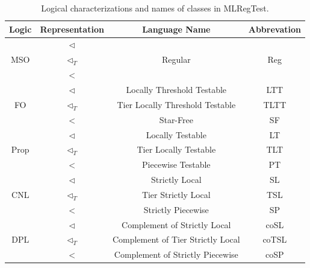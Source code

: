 \documentclass[twoside,11pt]{article}
\begin{document}
  \begin{table}[!t]
    \centering
    \begin{tabular}{cccc}
      \toprule
      Logic                 & Representation    & Language Name                     & Abbrevation          \\
      \midrule
      \multirow{3}{*}{MSO}  & $\triangleleft$   & \multirow{3}{*}{Regular}          & \multirow{3}{*}{Reg} \\
                            & $\triangleleft_T$ &           &                      \\
                            & $<$               &          &                      \\
      \midrule
      \multirow{3}{*}{FO}   & $\triangleleft$   & Locally Threshold Testable        & LTT                  \\
                            & $\triangleleft_T$ & Tier Locally Threshold Testable   & TLTT                 \\
                            & $<$               & Star-Free                         & SF                   \\
      \midrule
      \multirow{3}{*}{Prop} & $\triangleleft$   & Locally Testable                  & LT                   \\
                            & $\triangleleft_T$ & Tier Locally Testable             & TLT                  \\
                            & $<$               & Piecewise Testable                & PT                   \\
      \midrule
      \multirow{3}{*}{CNL}  & $\triangleleft$   & Strictly Local                    & SL                   \\
                            & $\triangleleft_T$ & Tier Strictly Local               & TSL                  \\
                            & $<$               & Strictly Piecewise                & SP                   \\
      \midrule
      \multirow{3}{*}{DPL}  & $\triangleleft$   & Complement of Strictly Local      & coSL                 \\
                            & $\triangleleft_T$ & Complement of Tier Strictly Local & coTSL                \\
                            & $<$               & Complement of Strictly Piecewise  & coSP                 \\
      \bottomrule
    \end{tabular}
    \caption{Logical characterizations and names of classes in MLRegTest.}
    \label{tab:classes}
  \end{table}
\end{document}
